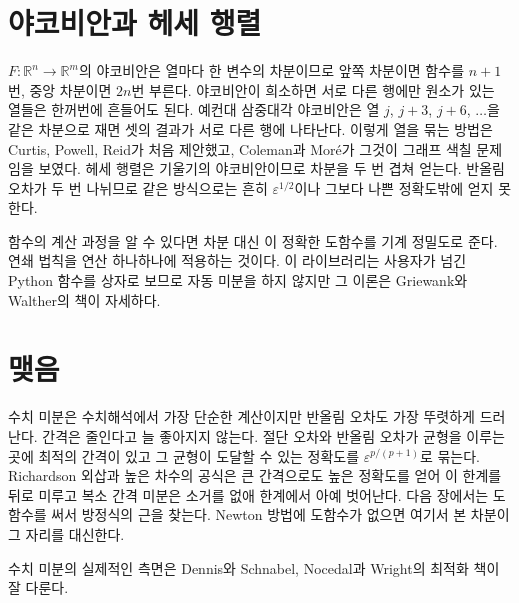 \section{야코비안과 헤세 행렬}
\label{sec:jacobian}

$F:\mathbb R^n\to\mathbb R^m$의 야코비안은 열마다 한 변수의 차분이므로 앞쪽 차분이면 함수를 $n+1$번, 중앙 차분이면 $2n$번 부른다. 야코비안이 희소하면 서로 다른 행에만 원소가 있는 열들은 한꺼번에 흔들어도 된다. 예컨대 삼중대각 야코비안은 열 $j$, $j+3$, $j+6$, $\dots$을 같은 차분으로 재면 셋의 결과가 서로 다른 행에 나타난다. 이렇게 열을 묶는 방법은 Curtis, Powell, Reid가 처음 제안했고\cite{curtis1974}, Coleman과 Moré가 그것이 그래프 색칠 문제임을 보였다\cite{coleman1983}. 헤세 행렬은 기울기의 야코비안이므로 차분을 두 번 겹쳐 얻는다. 반올림 오차가 두 번 나뉘므로 같은 방식으로는 흔히 $\varepsilon^{1/2}$이나 그보다 나쁜 정확도밖에 얻지 못한다.

함수의 계산 과정을 알 수 있다면 차분 대신 이 정확한 도함수를 기계 정밀도로 준다. 연쇄 법칙을 연산 하나하나에 적용하는 것이다. 이 라이브러리는 사용자가 넘긴 Python 함수를 상자로 보므로 자동 미분을 하지 않지만 그 이론은 Griewank와 Walther의 책\cite{griewank2008}이 자세하다.

\section{맺음}

수치 미분은 수치해석에서 가장 단순한 계산이지만 반올림 오차도 가장 뚜렷하게 드러난다. 간격은 줄인다고 늘 좋아지지 않는다. 절단 오차와 반올림 오차가 균형을 이루는 곳에 최적의 간격이 있고 그 균형이 도달할 수 있는 정확도를 $\varepsilon^{p/(p+1)}$로 묶는다. Richardson 외삽과 높은 차수의 공식은 큰 간격으로도 높은 정확도를 얻어 이 한계를 뒤로 미루고 복소 간격 미분은 소거를 없애 한계에서 아예 벗어난다. 다음 장에서는 도함수를 써서 방정식의 근을 찾는다. Newton 방법에 도함수가 없으면 여기서 본 차분이 그 자리를 대신한다.

수치 미분의 실제적인 측면은 Dennis와 Schnabel\cite{dennis1996}, Nocedal과 Wright\cite{nocedal2006}의 최적화 책이 잘 다룬다.

\chapterreferences
